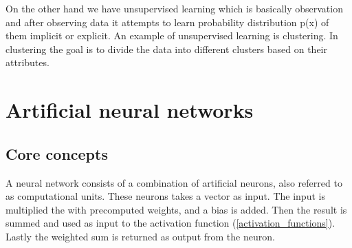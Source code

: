 On the other hand we have unsupervised learning which is basically observation and after observing data it attempts to learn probability distribution p(x) of them implicit or explicit. An example of unsupervised learning is clustering. In clustering the goal is to divide the data into different clusters based on their attributes. \parencite{goodfellow_deep_2016}

\section{Artificial neural networks}
\label{artificial_neural_networks}
% 
% 

\subsection{Core concepts}


A neural network consists of a combination of artificial neurons, also referred to as computational units. These neurons takes a vector as input. The input is multiplied the with precomputed weights, and a bias is added. Then the result is summed and used as input to the activation function (\ref{activation_functions}). Lastly the weighted sum is returned as output from the neuron. \parencite{_cs231n_????} \parencite{_multi-layer_????}



